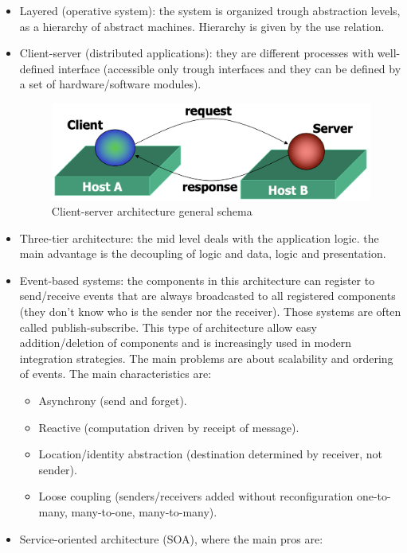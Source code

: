 \documentclass[12pt, a4paper]{report}
\theoremstyle{remark}
\begin{document}
    \begin{itemize}
        \item Layered (operative system): the system is organized trough abstraction levels, as a hierarchy of abstract machines. Hierarchy is given by the use relation.
        \item Client-server (distributed applications): they are different processes with well-defined interface (accessible only trough interfaces and they can be defined by a set of hardware/software modules).
        \begin{figure}
            \centering
            \includegraphics[width=0.5\linewidth]{images/clientserver.png}
            \caption{Client-server architecture general schema}
        \end{figure}
        \item Three-tier architecture: the mid level deals with the application logic. the main advantage is the decoupling of logic and data, logic and presentation.
        \item Event-based systems: the components in this architecture can register to send/receive events that are always broadcasted to all registered components (they don't know who is the sender nor the receiver). Those systems are often called publish-subscribe. This type of architecture allow easy addition/deletion of components and is increasingly used in modern integration strategies. The main problems are about scalability and ordering of events. The main characteristics are: 
        \begin{itemize}
            \item Asynchrony (send and forget).
            \item Reactive (computation driven by receipt of message).
            \item Location/identity abstraction (destination determined by receiver, not sender). 
            \item Loose coupling (senders/receivers added without reconfiguration one-to-many, many-to-one, many-to-many).
        \end{itemize}
        \item Service-oriented architecture (SOA), where the main pros are: 
        \begin{itemize}

\end{itemize}
\end{itemize}
\end{document}
